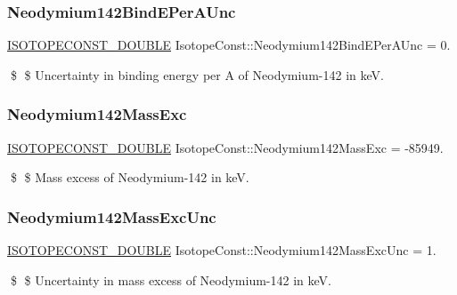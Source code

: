 \subsubsection{\texorpdfstring{Neodymium142\+Bind\+E\+Per\+A\+Unc}{Neodymium142BindEPerAUnc}}
{\footnotesize\ttfamily \mbox{\hyperlink{group___isotope_const-_macros_ga8f45a7272ce02c0b4c65c44636ed719a}{I\+S\+O\+T\+O\+P\+E\+C\+O\+N\+S\+T\+\_\+\+D\+O\+U\+B\+LE}} Isotope\+Const\+::\+Neodymium142\+Bind\+E\+Per\+A\+Unc = 0.}

\$ \$ Uncertainty in binding energy per A of Neodymium-\/142 in keV. \mbox{\label{group___isotope_const-_neodymium-_nd142_ga0eb3746546d08c7599bfdb5d2bfabcd9}} 
\subsubsection{\texorpdfstring{Neodymium142\+Mass\+Exc}{Neodymium142MassExc}}
{\footnotesize\ttfamily \mbox{\hyperlink{group___isotope_const-_macros_ga8f45a7272ce02c0b4c65c44636ed719a}{I\+S\+O\+T\+O\+P\+E\+C\+O\+N\+S\+T\+\_\+\+D\+O\+U\+B\+LE}} Isotope\+Const\+::\+Neodymium142\+Mass\+Exc = -\/85949.}

\$ \$ Mass excess of Neodymium-\/142 in keV. \mbox{\label{group___isotope_const-_neodymium-_nd142_ga3b17878ddb1774cfe2a5e395c06bcb11}} 
\subsubsection{\texorpdfstring{Neodymium142\+Mass\+Exc\+Unc}{Neodymium142MassExcUnc}}
{\footnotesize\ttfamily \mbox{\hyperlink{group___isotope_const-_macros_ga8f45a7272ce02c0b4c65c44636ed719a}{I\+S\+O\+T\+O\+P\+E\+C\+O\+N\+S\+T\+\_\+\+D\+O\+U\+B\+LE}} Isotope\+Const\+::\+Neodymium142\+Mass\+Exc\+Unc = 1.}

\$ \$ Uncertainty in mass excess of Neodymium-\/142 in keV. \mbox{\label{group___isotope_const-_neodymium-_nd142_gabb66502ec6cfa59908150af96fa2e73a}} 
